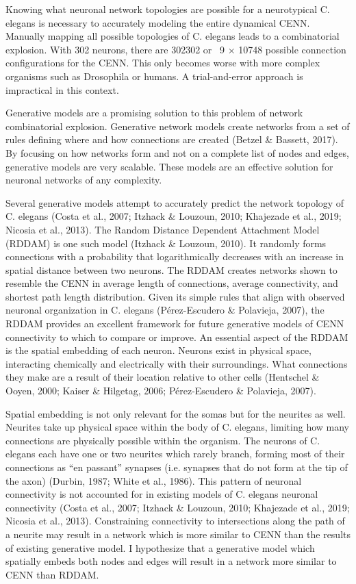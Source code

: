 Knowing what neuronal network topologies are possible for a neurotypical C. elegans is necessary to accurately modeling the entire dynamical CENN. Manually mapping all possible topologies of C. elegans leads to a combinatorial explosion. With 302 neurons, there are 302302 or ~9 × 10748 possible connection configurations for the CENN. This only becomes worse with more complex organisms such as Drosophila or humans. A trial-and-error approach is impractical in this context.

Generative models are a promising solution to this problem of network combinatorial explosion. Generative network models create networks from a set of rules defining where and how connections are created (Betzel \& Bassett, 2017). By focusing on how networks form and not on a complete list of nodes and edges, generative models are very scalable. These models are an effective solution for neuronal networks of any complexity. 

Several generative models attempt to accurately predict the network topology of C. elegans (Costa et al., 2007; Itzhack \& Louzoun, 2010; Khajezade et al., 2019; Nicosia et al., 2013). The Random Distance Dependent Attachment Model (RDDAM) is one such model (Itzhack \& Louzoun, 2010). It randomly forms connections with a probability that logarithmically decreases with an increase in spatial distance between two neurons. The RDDAM creates networks shown to resemble the CENN in average length of connections, average connectivity, and shortest path length distribution. Given its simple rules that align with observed neuronal organization in C. elegans (Pérez-Escudero \& Polavieja, 2007), the RDDAM provides an excellent framework for future generative models of CENN connectivity to which to compare or improve. An essential aspect of the RDDAM is the spatial embedding of each neuron. Neurons exist in physical space, interacting chemically and electrically with their surroundings. What connections they make are a result of their location relative to other cells (Hentschel \& Ooyen, 2000; Kaiser \& Hilgetag, 2006; Pérez-Escudero \& Polavieja, 2007). 

Spatial embedding is not only relevant for the somas but for the neurites as well. Neurites take up physical space within the body of C. elegans, limiting how many connections are physically possible within the organism. The neurons of C. elegans each have one or two neurites which rarely branch, forming most of their connections as “en passant” synapses (i.e. synapses that do not form at the tip of the axon) (Durbin, 1987; White et al., 1986). This pattern of neuronal connectivity is not accounted for in existing models of C. elegans neuronal connectivity (Costa et al., 2007; Itzhack \& Louzoun, 2010; Khajezade et al., 2019; Nicosia et al., 2013). Constraining connectivity to intersections along the path of a neurite may result in a network which is more similar to CENN than the results of existing generative model. I hypothesize that a generative model which spatially embeds both nodes and edges will result in a network more similar to CENN than RDDAM.

